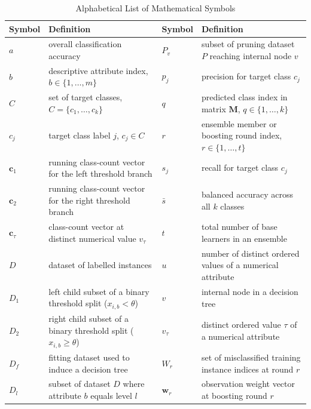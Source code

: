 \begin{table}[!ht]
\centering
\caption{Alphabetical List of Mathematical Symbols}
\label{tab:symbols}
\footnotesize
\setlength{\tabcolsep}{4pt}
\begin{tabular}{lp{6.8cm}lp{6.8cm}}
\toprule
\textbf{Symbol} & \textbf{Definition} & \textbf{Symbol} & \textbf{Definition} \\
\midrule
$a$               & overall classification accuracy & $P_v$           & subset of pruning dataset $P$ reaching internal node $v$ \\
$b$               & descriptive attribute index, $b \in \{1, \dots, m\}$ & $p_j$           & precision for target class $c_j$ \\
$C$               & set of target classes, $C = \{c_1, \dots, c_k\}$ & $q$             & predicted class index in matrix $\mathbf{M}$, $q \in \{1, \dots, k\}$ \\
$c_j$             & target class label $j$, $c_j \in C$ & $r$             & ensemble member or boosting round index, $r \in \{1, \dots, t\}$ \\
$\mathbf{c}_1$    & running class-count vector for the left threshold branch & $s_j$           & recall for target class $c_j$ \\
$\mathbf{c}_2$    & running class-count vector for the right threshold branch & $\bar{s}$       & balanced accuracy across all $k$ classes \\
$\mathbf{c}_\tau$ & class-count vector at distinct numerical value $v_\tau$ & $t$             & total number of base learners in an ensemble \\
$D$               & dataset of labelled instances & $u$             & number of distinct ordered values of a numerical attribute \\
$D_1$             & left child subset of a binary threshold split ($x_{i,b} < \theta$) & $v$             & internal node in a decision tree \\
$D_2$             & right child subset of a binary threshold split ($x_{i,b} \ge \theta$) & $v_\tau$        & distinct ordered value $\tau$ of a numerical attribute \\
$D_f$             & fitting dataset used to induce a decision tree & $W_r$           & set of misclassified training instance indices at round $r$ \\
$D_l$             & subset of dataset $D$ where attribute $b$ equals level $l$ & $\mathbf{w}_r$  & observation weight vector at boosting round $r$ \\

\end{tabular}
\end{table}
